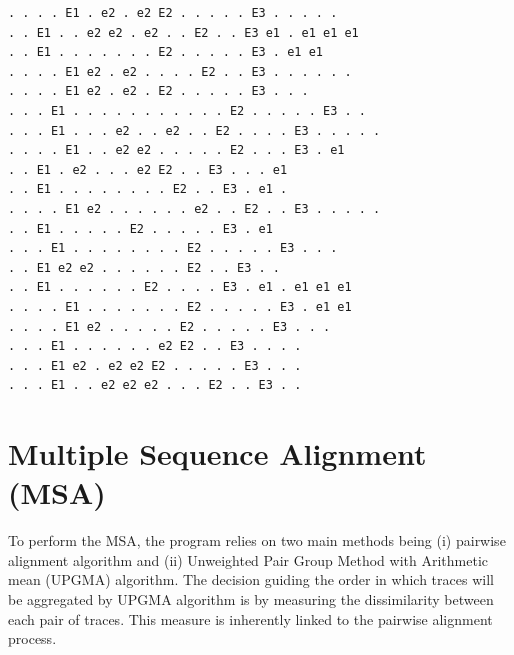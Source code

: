 \documentclass[12pt,a4paper]{article}
\begin{document}
\begin{lstlisting}[caption={Traces generated from expression (2-3)E1$<$(4-8)e2X10$|$E2\%25$>$E2(2-4)E3$<$(2-5)e1\%40$>$}]
. . . . E1 . e2 . e2 E2 . . . . . E3 . . . . .
. . E1 . . e2 e2 . e2 . . E2 . . E3 e1 . e1 e1 e1
. . E1 . . . . . . . E2 . . . . . E3 . e1 e1
. . . . E1 e2 . e2 . . . . E2 . . E3 . . . . . .
. . . . E1 e2 . e2 . E2 . . . . . E3 . . .
. . . E1 . . . . . . . . . . . E2 . . . . . E3 . .
. . . E1 . . . e2 . . e2 . . E2 . . . . E3 . . . . .
. . . . E1 . . e2 e2 . . . . . E2 . . . E3 . e1
. . E1 . e2 . . . e2 E2 . . E3 . . . e1
. . E1 . . . . . . . . E2 . . E3 . e1 .
. . . . E1 e2 . . . . . . e2 . . E2 . . E3 . . . . .
. . E1 . . . . . E2 . . . . . E3 . e1
. . . E1 . . . . . . . . E2 . . . . . E3 . . .
. . E1 e2 e2 . . . . . . E2 . . E3 . .
. . E1 . . . . . . E2 . . . . E3 . e1 . e1 e1 e1
. . . . E1 . . . . . . . E2 . . . . . E3 . e1 e1
. . . . E1 e2 . . . . . E2 . . . . . E3 . . .
. . . E1 . . . . . . e2 E2 . . E3 . . . .
. . . E1 e2 . e2 e2 E2 . . . . . E3 . . .
. . . E1 . . e2 e2 e2 . . . E2 . . E3 . .
\end{lstlisting}




\section{Multiple Sequence Alignment (MSA)}


To perform the MSA, the program relies on two main methods being (i) pairwise alignment algorithm and (ii) Unweighted Pair Group Method with Arithmetic mean (UPGMA) algorithm.
The decision guiding the order in which traces will be aggregated by UPGMA algorithm is by measuring the dissimilarity between each pair of traces. This measure is inherently linked to the pairwise alignment process.
\end{document}

